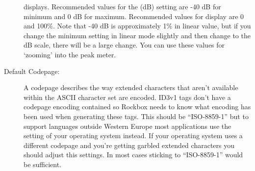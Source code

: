 \begin{description}
{\begin{description}
        displays. Recommended values for the  (dB) setting
        are {}-40 dB for minimum and 0 dB for maximum. Recommended values
        for  display are 0 and 100\%. Note that {}-40 dB is
        approximately 1\% in linear value, but if you change the minimum
        setting in linear mode slightly and then change to the dB scale,
        there will be a large change. You can use these values for `zooming'
        into the peak meter.
      \end{description}
    }
    \item[Default Codepage:]
      A codepage describes the way extended characters that aren't available
      within the ASCII character set are encoded. ID3v1 tags don't have a
      codepage encoding contained so Rockbox needs to know what encoding has
      been used when generating these tags. This should be ``ISO-8859-1'' but
      to support languages outside Western Europe most applications use
      the setting of your operating system instead. If your operating system
      uses a different codepage and you're getting garbled extended characters
      you should adjust this settings. In most cases sticking to
      ``ISO-8859-1'' would be sufficient.
  \end{description}
